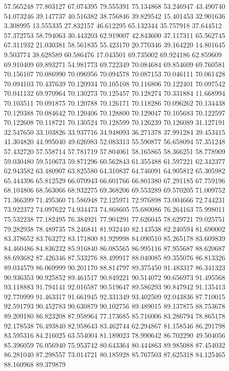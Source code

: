 57.565248
77.803127
67.074395
79.555391
75.134868
53.246947
43.490740
54.073246
39.147737
40.516382
38.756846
39.829542
15.401453
32.901636
3.308995
13.555335
27.832157
46.612295
65.132344
35.757918
37.644512
57.372753
58.794063
30.443203
62.919007
42.843600
37.117311
65.562745
67.311932
21.030381
58.561835
55.423170
20.770346
39.164220
14.801645
9.503774
38.628589
60.586476
17.043501
69.735002
69.924186
62.859609
69.910409
69.893271
54.981773
69.722349
70.084684
69.854609
69.760581
70.156107
70.086990
70.096956
70.094578
70.087153
70.046111
70.061428
70.094103
70.437639
70.120934
70.105108
70.116806
70.122401
70.097542
70.041132
69.970964
70.130273
70.125457
70.128274
70.331884
11.668994
70.103511
70.091875
70.120788
70.126171
70.118286
70.096262
70.134438
70.129388
70.084642
70.120406
70.128800
70.129047
70.105683
70.122597
70.122608
70.118721
70.130524
70.128599
70.126239
70.126089
31.127191
32.547650
33.103826
33.937716
34.948093
36.271378
37.991284
39.453415
41.304820
44.995040
49.626983
52.083313
55.590877
56.658094
57.351248
57.432720
57.558714
57.781719
57.804061
58.165865
58.366251
58.778909
59.030480
59.510673
59.871296
60.562843
61.355488
61.597221
62.342377
62.943582
63.480907
63.825580
64.310837
64.746091
64.905812
65.305982
65.444396
65.812529
66.070943
66.601766
66.801380
67.291185
67.759196
68.104806
68.563066
68.932275
69.368206
69.553289
69.570205
71.009752
71.366399
71.495360
71.586948
72.125971
72.976898
73.004666
72.744231
73.922372
74.097622
74.934473
74.868605
75.680086
76.264163
75.998011
75.532238
77.182495
76.384921
77.904291
77.626045
78.629721
79.025751
79.282938
78.489735
78.246841
81.932440
82.143538
82.240594
81.690002
83.378652
83.763272
83.171800
81.929998
84.090510
85.265178
83.609839
84.460486
84.836232
85.916840
86.085565
86.995116
87.955687
88.620687
88.693682
87.426346
87.533276
88.499917
88.040085
89.355076
86.813326
89.034579
86.069999
90.201170
88.814797
89.375450
91.483317
86.341323
90.936353
90.925852
89.461517
90.849221
90.514072
90.656973
91.495568
93.118883
91.794141
92.016587
90.519647
89.586293
90.847942
91.135413
92.770999
91.463317
91.661945
92.331349
93.402509
92.043836
87.710015
92.591793
90.452783
90.630879
90.102756
89.489015
89.137875
88.753678
89.209180
86.823208
87.958964
77.173685
85.716006
83.286794
78.865178
92.178538
76.493840
82.958643
83.462744
62.294867
81.158546
86.291798
83.595316
84.216025
63.554004
81.189023
78.990642
86.702290
49.504056
85.396059
76.056940
75.953742
80.643364
80.444863
89.985088
87.454032
86.281040
87.298557
73.014721
80.185928
85.767503
87.625318
84.125465
88.160968
89.379879
